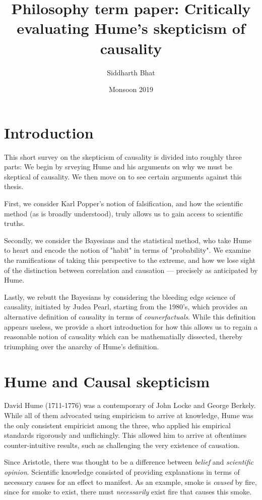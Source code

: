 \documentclass{article}
\title{Philosophy term paper: Critically evaluating Hume's skepticism of causality}
\author{Siddharth Bhat}
\date{Monsoon 2019}
\begin{document}
 
\maketitle

\section{Introduction}
This short survey on  the skepticism of causality is divided into roughly three
parts: We begin by srveying Hume and his arguments on why we must be skeptical
of causality. We then move on to see certain arguments against this thesis.

First, we consider Karl Popper's notion of falsification, and how the
scientific method (as is broadly understood), truly allows us to gain access to
scientific truths.

Secondly, we consider the Bayesians and the statistical method, who take Hume
to heart and encode the notion of "habit" in terms of "probability". We examine
the ramifications of taking this perspective to the extreme, and how we lose
sight of the distinction between correlation and causation --- precisely as
anticipated by Hume. 

Lastly, we rebutt the Bayesians by considering the bleeding edge science
of causality, initiated by Judea Pearl, starting from the 1980's, which provides
an alternative definition of causality in terms of \emph{counerfactuals}. While
this definition appears useless, we provide a short introduction for how this
allows us to regain a reasonable notion of causality which can be mathematially
dissected, thereby triumphing over the anarchy of Hume's definition.

\section{Hume and Causal skepticism}

David Hume (1711-1776) was a contemporary of John Locke and George Berkely.
While all of them advocated using empiricism to arrive at knowledge, Hume was
the only consistent empiricist among the three, who applied his empirical
standards rigorously and unflichingly. This allowed him to arrive at oftentimes
counter-intuitive results, such as challenging the very existence of causation.

Since Aristotle, there was thought to be a difference between \emph{belief}
and \emph{scientific opinion}. Scientific knowledge consisted of providing
explanations in terms of necessary causes for an effect to manifest. As an
example, smoke is \emph{caused} by fire, since for smoke to exist, there must
\emph{necessarily} exist fire that causes this smoke. 
\end{document}
